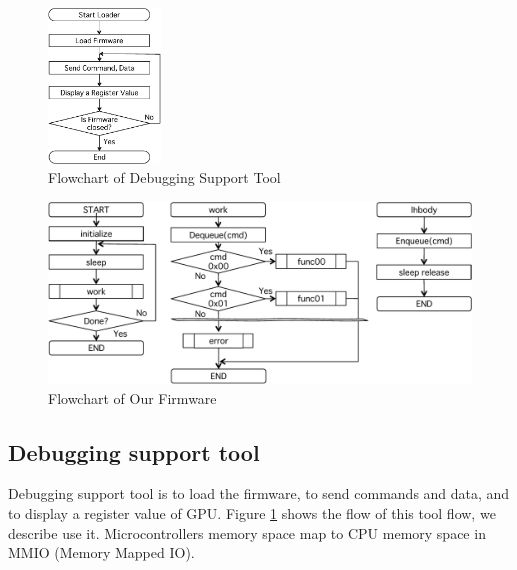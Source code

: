 \begin{figure}
\begin{center}
\includegraphics[width=3cm]{./img/loader.pdf}
\end{center}
\caption{Flowchart of Debugging Support Tool}
\label{fig:loader}
\end{figure}

\begin{figure}
\begin{center}
\includegraphics[width=12cm]{./img/firmware.pdf}
\end{center}
\caption{Flowchart of Our Firmware }
\label{fig:firmware}
\end{figure}


\subsection{Debugging support tool}
Debugging support tool is to load the firmware, to send commands and data, and to display a register value of GPU.
Figure \ref{fig:loader} shows the flow of this tool flow, we describe use it.
Microcontrollers memory space map to  CPU memory space in MMIO (Memory Mapped IO).


